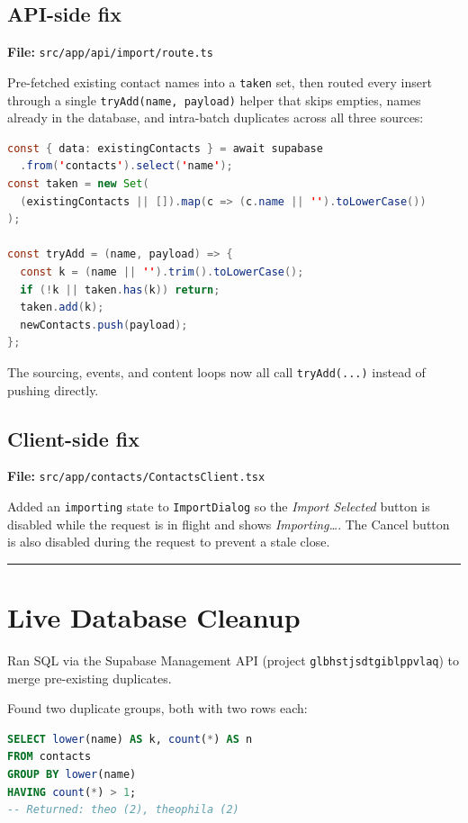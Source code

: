 \documentclass[11pt,a4paper]{article}
\begin{document}
\subsection{API-side fix}

\textbf{File:} \texttt{src/app/api/import/route.ts}

Pre-fetched existing contact names into a \texttt{taken} set, then routed
every insert through a single \texttt{tryAdd(name, payload)} helper that
skips empties, names already in the database, and intra-batch duplicates
across all three sources:

\begin{lstlisting}[language=Java]
const { data: existingContacts } = await supabase
  .from('contacts').select('name');
const taken = new Set(
  (existingContacts || []).map(c => (c.name || '').toLowerCase())
);

const tryAdd = (name, payload) => {
  const k = (name || '').trim().toLowerCase();
  if (!k || taken.has(k)) return;
  taken.add(k);
  newContacts.push(payload);
};
\end{lstlisting}

The sourcing, events, and content loops now all call \texttt{tryAdd(...)}
instead of pushing directly.

\subsection{Client-side fix}

\textbf{File:} \texttt{src/app/contacts/ContactsClient.tsx}

Added an \texttt{importing} state to \texttt{ImportDialog} so the
\emph{Import Selected} button is disabled while the request is in flight
and shows \emph{Importing\ldots}. The Cancel button is also disabled
during the request to prevent a stale close.

\hrule
\bigskip

\section{Live Database Cleanup}

Ran SQL via the Supabase Management API
(project \texttt{glbhstjsdtgiblppvlaq}) to merge pre-existing duplicates.

Found two duplicate groups, both with two rows each:

\begin{lstlisting}[language=SQL]
SELECT lower(name) AS k, count(*) AS n
FROM contacts
GROUP BY lower(name)
HAVING count(*) > 1;
-- Returned: theo (2), theophila (2)
\end{lstlisting}
\end{document}
